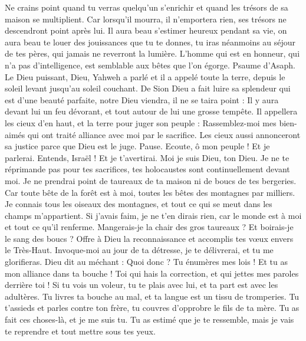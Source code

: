 \begin{multicols}{2}
Ne crains point quand tu verras quelqu'un s’enrichir et quand les trésors de sa maison se multiplient.
Car lorsqu'il mourra, il n'emportera rien, ses trésors ne descendront point après lui.
Il aura beau s’estimer heureux pendant sa vie, on aura beau te louer des jouissances que tu te donnes,
tu iras néanmoins au séjour de tes pères, qui jamais ne reverront la lumière.
L'homme qui est en honneur, qui n'a pas d'intelligence, est semblable aux bêtes que l’on égorge.
\VerseOne{}Psaume d'Asaph. Le Dieu puissant, Dieu, Yahweh a parlé et il a appelé toute la terre, depuis le soleil levant jusqu’au soleil couchant.
De Sion Dieu a fait luire sa splendeur qui est d'une beauté parfaite,
notre Dieu viendra, il ne se taira point : Il y aura devant lui un feu dévorant, et tout autour de lui une grosse tempête.
Il appellera les cieux d'en haut, et la terre pour juger son peuple :
Rassemblez-moi mes bien-aimés qui ont traité alliance avec moi par le sacrifice.
Les cieux aussi annonceront sa justice parce que Dieu est le juge. Pause.
Ecoute, ô mon peuple ! Et je parlerai. Entends, Israël ! Et je t’avertirai. Moi je suis Dieu, ton Dieu.
Je ne te réprimande pas pour tes sacrifices, tes holocaustes sont continuellement devant moi.
Je ne prendrai point de taureaux de ta maison ni de boucs de tes bergeries.
Car toute bête de la forêt est à moi, toutes les bêtes des montagnes par milliers.
Je connais tous les oiseaux des montagnes, et tout ce qui se meut dans les champs m’appartient.
Si j'avais faim, je ne t'en dirais rien, car le monde est à moi et tout ce qu’il renferme.
Mangerais-je la chair des gros taureaux ? Et boirais-je le sang des boucs ?
Offre à Dieu la reconnaissance et accomplis tes vœux envers le Très-Haut.
Invoque-moi au jour de ta détresse, je te délivrerai, et tu me glorifieras.
Dieu dit au méchant : Quoi donc ? Tu énumères mes lois ! Et tu as mon alliance dans ta bouche !
Toi qui hais la correction, et qui jettes mes paroles derrière toi !
Si tu vois un voleur, tu te plais avec lui, et ta part est avec les adultères.
Tu livres ta bouche au mal, et ta langue est un tissu de tromperies.
Tu t'assieds et parles contre ton frère, tu couvres d'opprobre le fils de ta mère.
Tu as fait ces choses-là, et je me suis tu. Tu as estimé que je te ressemble, mais je vais te reprendre et tout mettre sous tes yeux.

\end{multicols}
